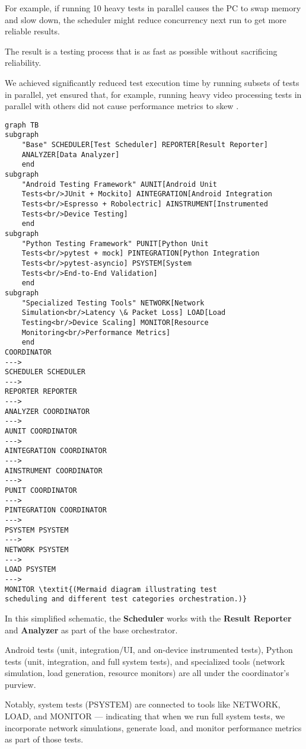 {{For example, if running 10 heavy tests in parallel causes the PC to swap memory
and slow down, the scheduler might reduce concurrency next run to get more
reliable results.

The result is a testing process that is as fast as possible without sacrificing
reliability.

We achieved significantly reduced test execution time by running subsets of tests in parallel, yet ensured that, for example, running heavy video processing tests in parallel with others did not cause performance metrics to skew
.
\begin{verbatim}
graph TB
subgraph
    "Base" SCHEDULER[Test Scheduler] REPORTER[Result Reporter]
    ANALYZER[Data Analyzer]
    end
subgraph
    "Android Testing Framework" AUNIT[Android Unit
    Tests<br/>JUnit + Mockito] AINTEGRATION[Android Integration
    Tests<br/>Espresso + Robolectric] AINSTRUMENT[Instrumented
    Tests<br/>Device Testing]
    end
subgraph
    "Python Testing Framework" PUNIT[Python Unit
    Tests<br/>pytest + mock] PINTEGRATION[Python Integration
    Tests<br/>pytest-asyncio] PSYSTEM[System
    Tests<br/>End-to-End Validation]
    end
subgraph
    "Specialized Testing Tools" NETWORK[Network
    Simulation<br/>Latency \& Packet Loss] LOAD[Load
    Testing<br/>Device Scaling] MONITOR[Resource
    Monitoring<br/>Performance Metrics]
    end
COORDINATOR
--->
SCHEDULER SCHEDULER
--->
REPORTER REPORTER
--->
ANALYZER COORDINATOR
--->
AUNIT COORDINATOR
--->
AINTEGRATION COORDINATOR
--->
AINSTRUMENT COORDINATOR
--->
PUNIT COORDINATOR
--->
PINTEGRATION COORDINATOR
--->
PSYSTEM PSYSTEM
--->
NETWORK PSYSTEM
--->
LOAD PSYSTEM
--->
MONITOR \textit{(Mermaid diagram illustrating test
scheduling and different test categories orchestration.)}
\end{verbatim}

In this simplified schematic, the \textbf{Scheduler}
 works with the \textbf{Result Reporter}
 and \textbf{Analyzer}
 as part of the base orchestrator.

Android tests (unit, integration/UI, and on-device instrumented tests), Python
tests (unit, integration, and full system tests), and specialized tools (network
simulation, load generation, resource monitors) are all under the coordinator's
purview.

Notably, system tests (PSYSTEM) are connected to tools like NETWORK, LOAD, and
MONITOR --- indicating that when we run full system tests, we incorporate
network simulations, generate load, and monitor performance metrics as part of
those tests.

}}
